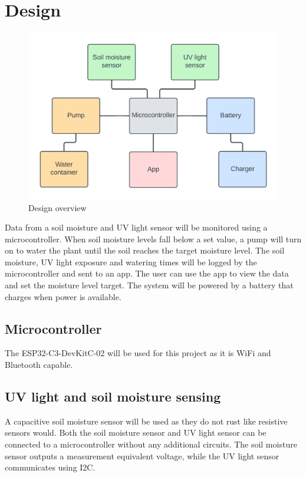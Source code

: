 \graphicspath{{general_design/fig/}}

\chapter{Design}
\label{chap:general_design}

\begin{figure}[!h]
    \centering
    \includegraphics{design_diagram.png}
    \caption{Design overview}
    \label{fig:design_overview}
\end{figure}

Data from a soil moisture and UV light sensor will be monitored using a microcontroller. When soil moisture levels fall below a set value, a pump will turn on to water the plant until the soil reaches the target moisture level. The soil moisture, UV light exposure and watering times will be logged by the microcontroller and sent to an app. The user can use the app to view the data and set the moisture level target. The system will be powered by a battery that charges when power is available.
\section{Microcontroller}
The ESP32-C3-DevKitC-02 will be used for this project as it is WiFi and Bluetooth capable.

\section{UV light and soil moisture sensing}
A capacitive soil moisture sensor will be used as they do not rust like resistive sensors would. Both the soil moisture sensor and UV light sensor can be connected to a microcontroller without any additional circuits. The soil moisture sensor outputs a measurement equivalent voltage, while the UV light sensor communicates using I2C.

